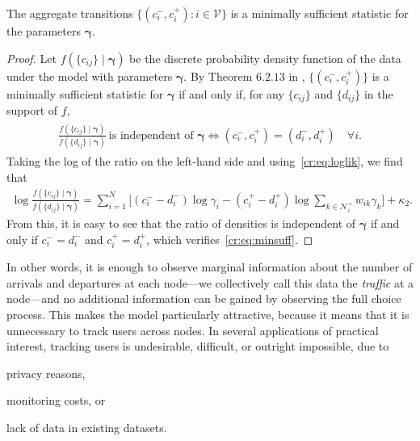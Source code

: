 \begin{theorem}
The aggregate transitions  $\{ (c^-_i, c^+_i) : i \in \mathcal{V} \}$ is a minimally sufficient statistic for the parameters $\bm{\gamma}$.
\end{theorem}

\begin{proof}
Let $f(\{ c_{ij} \} \mid \bm{\gamma})$ be the discrete probability density function of the data under the model with parameters $\bm{\gamma}$.
By Theorem $6.2.13$ in \citet{casella2002statistical}, $\{ (c^-_i, c^+_i) \}$ is a minimally sufficient statistic for $\bm{\gamma}$ if and only if, for any $\{ c_{ij} \}$ and $\{ d_{ij} \}$ in the support of $f$,
\begin{align}
\label{cr:eq:minsuff}
\begin{aligned}
\frac{ f(\{ c_{ij} \} \mid \bm{\gamma}) }{ f(\{ d_{ij} \} \mid \bm{\gamma}) }\ \text{is independent of $\bm{\gamma}$}
\iff (c^-_i, c^+_i) = (d^-_i, d^+_i) \quad \forall i.
\end{aligned}
\end{align}
Taking the log of the ratio on the left-hand side and using~\eqref{cr:eq:loglik}, we find that
\begin{align*}
\log \frac{ f(\{ c_{ij} \} \mid \bm{\gamma}) }{ f(\{ d_{ij} \} \mid \bm{\gamma}) } =
  \sum_{i = 1}^N \bigg[ (c^-_i\!-\!d^-_i) \log \gamma_i
                       - (c^+_i\!-\!d^+_i) \log\!\sum_{k \in \mathcal{N}^+_i}\!w_{ik} \gamma_k \bigg] + \kappa_2.
\end{align*}
From this, it is easy to see that the ratio of densities is independent of $\bm{\gamma}$ if and only if $c^-_i = d^-_i$ and $c^+_i = d^+_i$, which verifies~\eqref{cr:eq:minsuff}.
\end{proof}

In other words, it is enough to observe marginal information about the number of arrivals and departures at each node---we collectively call this data the \emph{traffic} at a node---and no additional information can be gained by observing the full choice process.
This makes the model particularly attractive, because it means that it is unnecessary to track users across nodes.
In several applications of practical interest, tracking users is undesirable, difficult, or outright impossible, due to
\begin{enuminline}
\item privacy reasons,
\item monitoring costs, or
\item lack of data in existing datasets.
\end{enuminline}


